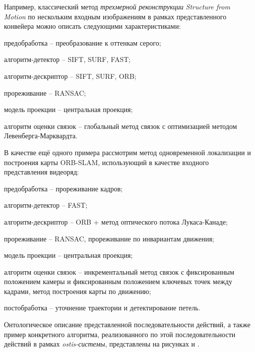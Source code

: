 Например, классический метод \textit{трехмерной реконструкции} \textit{Structure from Motion} по нескольким
входным изображениям в рамках представленного конвейера можно описать следующими характеристиками:
\begin{textitemize}
    \item предобработка -- преобразование к оттенкам серого;
    \item алгоритм-детектор -- SIFT, SURF, FAST;
    \item алгоритм-дескриптор -- SIFT, SURF, ORB;
    \item прореживание -- RANSAC;
    \item модель проекции -- центральная проекция;
    \item алгоритм оценки связок -- глобальный метод связок с оптимизацией методом Левенберга-Марквардта.
\end{textitemize}
В качестве ещё одного примера рассмотрим метод одновременной локализации и построения карты ORB-SLAM, использующий в качестве входного представления видеоряд:
\begin{textitemize}
    \item предобработка -- прореживание кадров;
    \item алгоритм-детектор -- FAST;
    \item алгоритм-дескриптор -- ORB + метод оптического потока Лукаса-Канаде;
    \item прореживание -- RANSAC, прореживание по инвариантам движения;
    \item модель проекции -- центральная проекция;
    \item алгоритм оценки связок -- инкрементальный метод связок с фиксированным положением камеры и фиксированным положением ключевых точек между кадрами, метод построения карты по движению;
    \item постобработка -- уточнение траектории и детектирование петель.
\end{textitemize}

Онтологическое описание представленной последовательности действий, а также пример конкретного алгоритма, реализованного по этой последовательности действий в рамках \textit{ostis-системы}, представлены на рисунках \textit{} и \textit{}.


